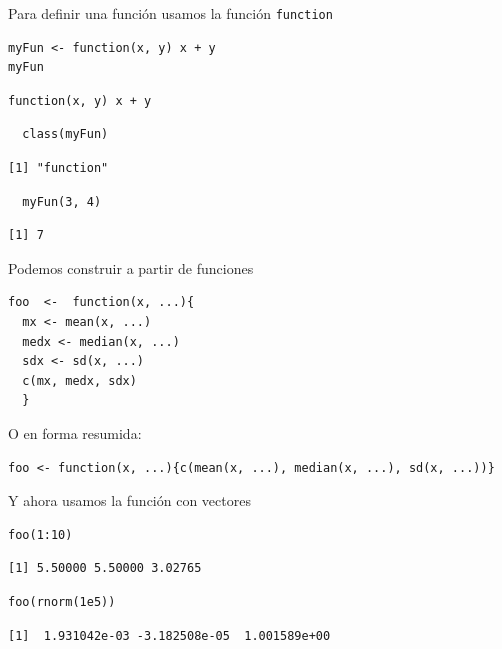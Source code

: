 \documentclass[xcolor={usenames,svgnames,dvipsnames}]{beamer}
\begin{document}
\begin{frame}[fragile,label=sec-2-5-1]{Para definir una función usamos la función \texttt{function}}
 \lstset{language=R,label= ,caption= ,numbers=none}
\begin{lstlisting}
myFun <- function(x, y) x + y
myFun
\end{lstlisting}

\begin{verbatim}
function(x, y) x + y
\end{verbatim}

\lstset{language=R,label= ,caption= ,numbers=none}
\begin{lstlisting}
  class(myFun)
\end{lstlisting}

\begin{verbatim}
[1] "function"
\end{verbatim}


\lstset{language=R,label= ,caption= ,numbers=none}
\begin{lstlisting}
  myFun(3, 4)
\end{lstlisting}

\begin{verbatim}
[1] 7
\end{verbatim}
\end{frame}

\begin{frame}[fragile,label=sec-2-5-2]{Podemos construir a partir de funciones}
 \lstset{language=R,label= ,caption= ,numbers=none}
\begin{lstlisting}
foo  <-  function(x, ...){
  mx <- mean(x, ...)
  medx <- median(x, ...)
  sdx <- sd(x, ...)
  c(mx, medx, sdx)
  }
\end{lstlisting}

O en forma resumida:
\lstset{language=R,label= ,caption= ,numbers=none}
\begin{lstlisting}
foo <- function(x, ...){c(mean(x, ...), median(x, ...), sd(x, ...))}
\end{lstlisting}
\end{frame}


\begin{frame}[fragile,label=sec-2-5-3]{Y ahora usamos la función con vectores}
 \lstset{language=R,label= ,caption= ,numbers=none}
\begin{lstlisting}
foo(1:10)
\end{lstlisting}

\begin{verbatim}
[1] 5.50000 5.50000 3.02765
\end{verbatim}

\lstset{language=R,label= ,caption= ,numbers=none}
\begin{lstlisting}
foo(rnorm(1e5))
\end{lstlisting}

\begin{verbatim}
[1]  1.931042e-03 -3.182508e-05  1.001589e+00
\end{verbatim}
\end{frame}
\end{document}
